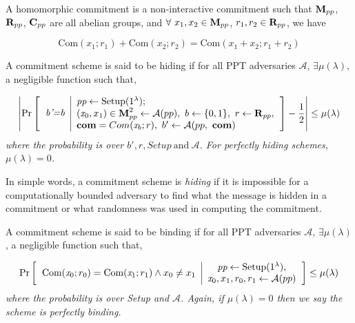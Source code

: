 \begin{defn}
    A homomorphic commitment is a non-interactive commitment such that ${\normalfont \textbf{M}_{pp}}$, ${\normalfont \textbf{R}_{pp}}$, ${\normalfont \textbf{C}_{pp}}$ are all abelian groups, and $\forall \ x_1, x_2 \in {\normalfont \textbf{M}_{pp}}$, $r_1, r_2 \in {\normalfont \textbf{R}_{pp}}$, we have 
\end{defn}
\begin{equation*}
    \text{Com}(x_1; r_1) + \text{Com}(x_2; r_2) = \text{Com}(x_1+ x_2; r_1+r_2)
\end{equation*}

\begin{defn}
    A commitment scheme is said to be hiding if for all PPT adversaries $\mathcal{A}$, $\exists \mu(\lambda)$, a negligible function such that,  
\end{defn}
\begin{equation*}
        \left|
        \Pr
        \left[
        \begin{tabular}{c | l}
             \multirow{3}{*}{$\textit{b'=b}$} 
             &
             $\textit{pp} \leftarrow \text{Setup}(1^{\lambda})$;\\
             &
             $(\textit{x}_0,x_1) \in \text{\textbf{M}}_{pp}^2 \leftarrow \mathcal{A}(pp), \
             b \leftarrow \{0,1\}, \ 
             r \leftarrow \text{\textbf{R}}_{pp},$ \\
             &
             $\textbf{com} = Com(\textit{x}_b; r),\ b' \leftarrow \mathcal{A}(pp, \ \textbf{com})$
        \end{tabular}
        \right]
        - \frac{1}{2}
        \right|
        \leq \mu(\lambda)
\end{equation*}
\textit{where the probability is over $b', r, Setup \ \text{and} \ \mathcal{A}$. For perfectly hiding schemes, $\mu(\lambda)=0$.}

In simple words, a commitment scheme is \textit{hiding} if it is impossible for a computationally bounded adversary to find what the message is hidden in a commitment or what randomness was used in computing the commitment.

\begin{defn}
    A commitment scheme is said to be binding if for all PPT adversaries $\mathcal{A}$, $\exists \mu(\lambda)$, a negligible function such that,
\end{defn}
\begin{equation*}
        \Pr 
        \left[
        \begin{tabular}{c | c}
             \multirow{2}{*}{$\text{Com}(\textit{x}_0;r_0)= \text{Com}(\textit{x}_1;r_1) \wedge x_0 \neq x_1$} 
             &
             $\textit{pp} \leftarrow \text{Setup}(1^{\lambda})$,\\
             &
             $\textit{x}_0, x_1, r_0, r_1 \leftarrow \mathcal{A}(pp)$
        \end{tabular}
        \right] 
        \leq \mu(\lambda)
\end{equation*}
\textit{where the probability is over Setup and $\mathcal{A}$. Again, if $\mu(\lambda)=0$ then we say the scheme is perfectly binding.}


